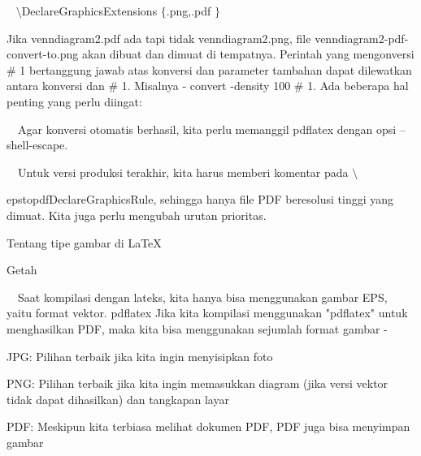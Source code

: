 \vspace{12pt}
\noindent
~  $  \setminus $DeclareGraphicsExtensions $  \{  $.png,.pdf $  \}  $ \par
\vspace{16pt}
\vspace{16pt}
\noindent
 \hspace*{0.5in} Jika venndiagram2.pdf ada tapi tidak venndiagram2.png, file venndiagram2-pdf-convert-to.png akan dibuat dan dimuat di tempatnya. Perintah yang mengonversi  $  \#  $ 1 bertanggung jawab atas konversi dan parameter tambahan dapat dilewatkan antara konversi dan  $  \#  $ 1. Misalnya - convert -density 100  $  \#  $ 1. Ada beberapa hal penting yang perlu diingat: \par
\vspace{12pt}
\noindent
 $  $ $  $ $  $ $  $Agar konversi otomatis berhasil, kita perlu memanggil pdflatex dengan opsi --shell-escape. \par
\vspace{12pt}
\noindent
 $  $ $  $ $  $ $  $Untuk versi produksi terakhir, kita harus memberi komentar pada  $  \setminus $  \par
\vspace{12pt}
\noindent
epstopdfDeclareGraphicsRule, sehingga hanya file PDF beresolusi tinggi yang dimuat. Kita juga perlu mengubah urutan prioritas. \par
\vspace{20pt}
\vspace{20pt}
\vspace{20pt}
\noindent
Tentang tipe gambar di LaTeX \par
\vspace{12pt}
\noindent
Getah \par
\vspace{12pt}
\noindent
 $  $ $  $ $  $ $  $Saat kompilasi dengan lateks, kita hanya bisa menggunakan gambar EPS, yaitu format vektor. pdflatex $  $Jika kita kompilasi menggunakan "pdflatex" untuk menghasilkan PDF, maka kita bisa menggunakan sejumlah format gambar - \par
\vspace{12pt}
\noindent
JPG: Pilihan terbaik jika kita ingin menyisipkan foto \par
\noindent
PNG: Pilihan terbaik jika kita ingin memasukkan diagram (jika versi vektor tidak dapat dihasilkan) dan tangkapan layar \par
\noindent
PDF: Meskipun kita terbiasa melihat dokumen PDF, PDF juga bisa menyimpan gambar \par
